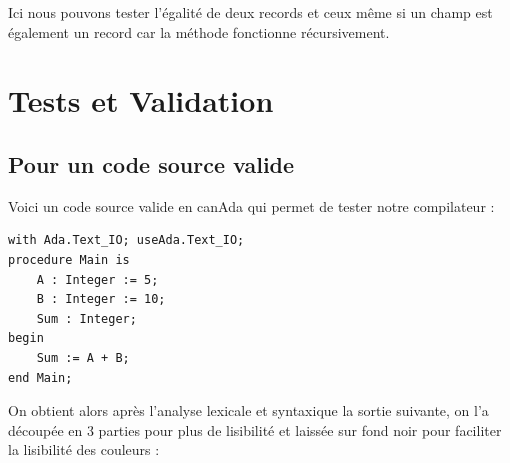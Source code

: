 \documentclass[french,a4paper]{article}
\begin{document}
    Ici nous pouvons tester l'égalité de deux records et ceux même si un champ est également un record car la méthode fonctionne récursivement.


    \section{Tests et Validation}\label{sec:tests-et-validation}

    \subsection{Pour un code source valide}\label{subsec:pour-un-code-source-valide}

    Voici un code source valide en canAda qui permet de tester notre compilateur :

    \begin{lstlisting}[label={lst:lstlisting16}]
with Ada.Text_IO; useAda.Text_IO;
procedure Main is
    A : Integer := 5;
    B : Integer := 10;
    Sum : Integer;
begin
    Sum := A + B;
end Main;
    \end{lstlisting}

    On obtient alors après l'analyse lexicale et syntaxique la sortie suivante, on l'a découpée en 3 parties pour plus de lisibilité et laissée sur fond noir pour faciliter la lisibilité des couleurs :
\end{document}
